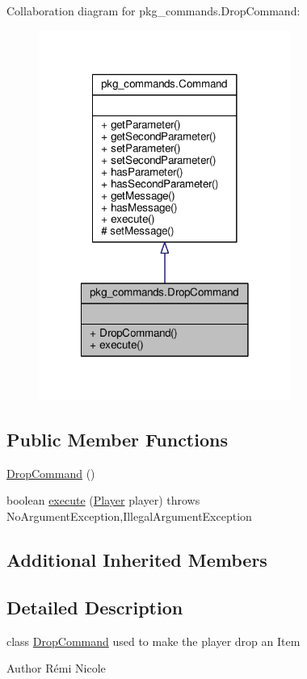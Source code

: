 Collaboration diagram for pkg\-\_\-commands.\-Drop\-Command\-:
\nopagebreak
\begin{figure}[H]
\begin{center}
\leavevmode
\includegraphics[width=234pt]{classpkg__commands_1_1DropCommand__coll__graph}
\end{center}
\end{figure}
\subsection*{Public Member Functions}
\begin{DoxyCompactItemize}
\item 
\hyperlink{classpkg__commands_1_1DropCommand_a2e755d7f4b0735183553d5d97d624f0c}{Drop\-Command} ()
\item 
boolean \hyperlink{classpkg__commands_1_1DropCommand_a742e37b2d2dd4e111130811ee2f4dd0b}{execute} (\hyperlink{classpkg__world_1_1Player}{Player} player)  throws No\-Argument\-Exception,\-Illegal\-Argument\-Exception 
\end{DoxyCompactItemize}
\subsection*{Additional Inherited Members}


\subsection{Detailed Description}
class \hyperlink{classpkg__commands_1_1DropCommand}{Drop\-Command} used to make the player drop an Item \begin{DoxyAuthor}{Author}
Rémi Nicole 
\end{DoxyAuthor}


